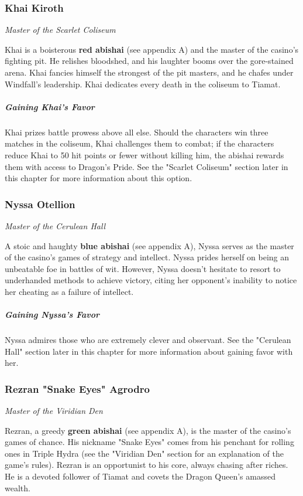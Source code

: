 \documentclass[10pt,a4paper,twoside,bg=print,twocolumn,openany,nodeprecatedcode]{dndbook}
\begin{document}
\subsubsection{Khai Kiroth}
\textit{Master of the Scarlet Coliseum}

Khai is a boisterous \textbf{red abishai} (see appendix A) and the master of the casino's fighting pit. He relishes bloodshed, and his laughter booms over the gore-stained arena. Khai fancies himself the strongest of the pit masters, and he chafes under Windfall's leadership. Khai dedicates every death in the coliseum to Tiamat.

\subparagraph{Gaining Khai's Favor}
Khai prizes battle prowess above all else. Should the characters win three matches in the coliseum, Khai challenges them to combat; if the characters reduce Khai to 50 hit points or fewer without killing him, the abishai rewards them with access to Dragon's Pride. See the "Scarlet Coliseum" section later in this chapter for more information about this option.

\subsubsection{Nyssa Otellion}
\textit{Master of the Cerulean Hall}

A stoic and haughty \textbf{blue abishai} (see appendix A), Nyssa serves as the master of the casino's games of strategy and intellect. Nyssa prides herself on being an unbeatable foe in battles of wit. However, Nyssa doesn't hesitate to resort to underhanded methods to achieve victory, citing her opponent's inability to notice her cheating as a failure of intellect.

\subparagraph{Gaining Nyssa's Favor}
Nyssa admires those who are extremely clever and observant. See the "Cerulean Hall" section later in this chapter for more information about gaining favor with her.

\subsubsection{Rezran "Snake Eyes" Agrodro}
\textit{Master of the Viridian Den}

Rezran, a greedy \textbf{green abishai} (see appendix A), is the master of the casino's games of chance. His nickname "Snake Eyes" comes from his penchant for rolling ones in Triple Hydra (see the "Viridian Den" section for an explanation of the game's rules). Rezran is an opportunist to his core, always chasing after riches. He is a devoted follower of Tiamat and covets the Dragon Queen's amassed wealth.
\end{document}
